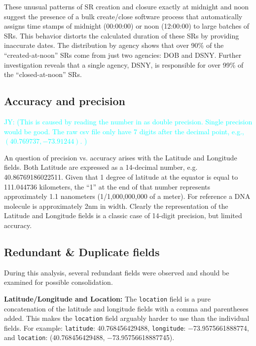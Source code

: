 \documentclass[linenumber]{jdsart}
\newcommand{\jy}[1]{\textcolor{cyan}{JY: (#1)}}
\begin{document}
These unusual patterns of SR creation and closure exactly at midnight 
and noon suggest the presence of a bulk create/close software process 
that automatically assigns time stamps of midnight (00:00:00) or noon 
(12:00:00) to large batches of SRs. This behavior distorts the 
calculated duration of these SRs by providing inaccurate dates. The 
distribution by agency shows that over 90\% of the ``created-at-noon'' 
SRs come from just two agencies: DOB and DSNY. Further investigation 
reveals that a single agency, DSNY, is responsible for over 99\% of 
the ``closed-at-noon'' SRs.



	
\subsection{Accuracy and precision}
\label{sec:precision}

\jy{This is caused by reading the number in as double
  precision. Single precision would be good. The raw csv file only
  have 7 digits after the decimal point, e.g.,
  $(40.769737, -73.91244)$.
  }


An question of precision vs. accuracy arises with the Latitude 
and Longitude fields. Both Latitude are expressed as 
a 14-decimal number, e.g. 40.86769186022511. Given 
that 1 degree of latitude at the equator is equal to 111.044736 
kilometers, the ``1'' at the end of that number represents 
approximately 1.1 nanometers (1/1,000,000,000 of a meter). For 
reference a DNA molecule is approximately 2nm in width. Clearly 
the representation of the Latitude and Longitude fields is a 
classic case of 14-digit precision, but limited accuracy. 



\subsection{Redundant \& Duplicate fields}
\label{sec:duplicates}

During this analysis, several redundant fields were observed and should 
be examined for possible consolidation.

\textbf{Latitude/Longitude and Location:} The \texttt{location} field 
is a pure concatenation of the latitude and longitude fields with a 
comma and parentheses added. This makes the \texttt{location} field 
arguably harder to use than the individual fields. For example:  
\texttt{latitude}: 40.768456429488, \texttt{longitude}: $-$73.9575661888774, 
and \texttt{location}: (40.768456429488, $-$73.95756618887745).
\end{document}
